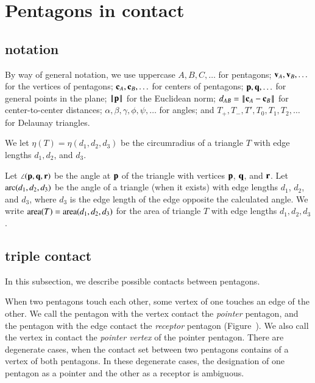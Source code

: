 \section{Pentagons in contact}


\subsection{notation}

By way of general notation, we use uppercase $A,B,C,\ldots$ for
pentagons; ${\mathbf v}_A,{\mathbf v}_B,\ldots$ for the vertices of pentagons;
${\mathbf c}_A,{\mathbf c}_B,\ldots$ for centers of pentagons; ${\mathbf p},{\mathbf q},\ldots$ for
general points in the plane; ${\hbox{\ensuremath{\hspace{0.1em}|\hspace{-0.1em}|\hspace{0.1em}}}{\mathbf p}\hbox{\ensuremath{\hspace{0.1em}|\hspace{-0.1em}|\hspace{0.1em}}}}$ for the Euclidean norm;
$\dx{AB}=\dd{A}{B}$ for center-to-center distances;
$\alpha,\beta,\gamma,\phi,\psi,\ldots$ for angles; and
$T_+,T_-,T',T_0,T_1,T_2,\ldots$ for Delaunay triangles.

We let $\eta(T) = \eta(d_1,d_2,d_3)$ be the circumradius of a triangle
$T$ with edge lengths $d_1,d_2$, and $d_3$.

Let $\angle({\mathbf p},{\mathbf q},{\mathbf r})$ be the angle at ${\mathbf p}$ of the triangle with
vertices ${\mathbf p}$, ${\mathbf q}$, and ${\mathbf r}$.  Let $\operatorname{arc}(d_1,d_2,d_3)$ be the angle
of a triangle (when it exists) with edge lengths $d_1$, $d_2$, and
$d_3$, where $d_3$ is the edge length of the edge opposite the
calculated angle.  We write ${\operatorname{area}}(T)= {\operatorname{area}}(d_1,d_2,d_3)$ for the
area of triangle $T$ with edge lengths $d_1,d_2,d_3$.






\subsection{triple contact}

In this subsection, we describe possible contacts between pentagons.

When two pentagons touch each other, some vertex of one touches an
edge of the other.  We call the pentagon with the vertex contact the
{\it pointer} pentagon, and the pentagon with the edge contact the
{\it receptor} pentagon (Figure~).  We also call the
vertex in contact the {\it pointer vertex} of the pointer pentagon. There are
degenerate cases, when the contact set between two pentagons contains
of a vertex of both pentagons.  In these degenerate cases, the
designation of one pentagon as a pointer and the other as a receptor
is ambiguous.



